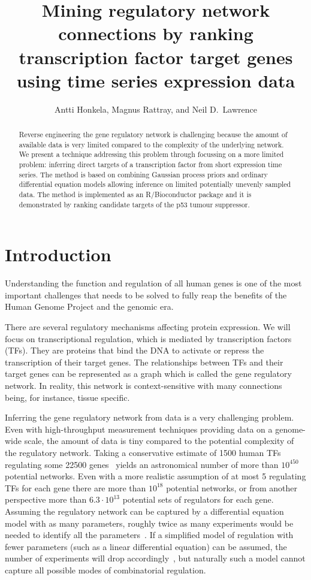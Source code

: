 \documentclass[11pt]{article}
\title{Mining regulatory network connections by ranking transcription
  factor target genes using time series expression data}
\author{Antti Honkela, Magnus Rattray, and Neil D.\ Lawrence}
\begin{document}
\maketitle

\begin{abstract}
Reverse engineering the gene regulatory network is challenging because
the amount of available data is very limited compared to the
complexity of the underlying network.  We present a technique
addressing this problem through focussing on a more limited problem:
inferring direct targets of a transcription factor from short
expression time series.  The method is based on combining Gaussian
process priors and ordinary differential equation models allowing
inference on limited potentially unevenly sampled data.  The method is
implemented as an R/Bioconductor package and it is demonstrated by
ranking candidate targets of the p53 tumour suppressor.
\end{abstract}

\onehalfspacing

\section{Introduction}

Understanding the function and regulation of all human genes is one of
the most important challenges that needs to be solved to fully reap
the benefits of the Human Genome Project and the genomic era.

There are several regulatory mechanisms affecting protein expression.
We will focus on transcriptional regulation, which is mediated by
transcription factors (TFs).  They are proteins that bind the DNA to
activate or repress the transcription of their target genes.  The
relationships between TFs and their target genes can be represented as
a graph which is called the gene regulatory network.  In reality, this
network is context-sensitive with many connections being, for
instance, tissue specific.

Inferring the gene regulatory network from data is a very challenging
problem.  Even with high-throughput measurement techniques
providing data on a genome-wide scale, the amount of data is tiny
compared to the potential complexity of the regulatory network.
Taking a conservative estimate of 1500 human TFs~\cite{Vaquerizas2009}
regulating some 22500 genes~\cite{Pertea2010a} yields an astronomical
number of more than $10^{450}$ potential networks.  Even with a more
realistic assumption of at most 5 regulating TFs for each gene there
are more than $10^{18}$ potential networks, or from another
perspective more than $6.3 \cdot 10^{13}$ potential sets of regulators
for each gene.  Assuming the regulatory network can be captured by a
differential equation model with as many parameters, roughly 
twice as many
experiments would be needed to identify all the
parameters~\cite{Sontag2002}.  If a simplified model of regulation
with fewer parameters (such as a linear differential equation) can be
assumed, the number of experiments will drop
accordingly~\cite{Stark2003}, but naturally such a model cannot
capture all possible modes of combinatorial regulation.
\end{document}
